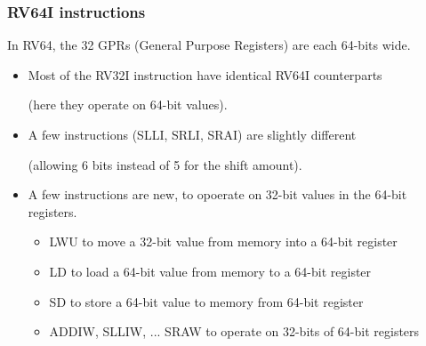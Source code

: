 \begin{frame}
\frametitle{RV64I instructions}

In RV64, the 32 GPRs (General Purpose Registers) are each 64-bits wide.

\vspace{1ex}

\begin{itemize}

\item Most of the RV32I instruction have identical RV64I counterparts

  {\footnotesize (here they operate on 64-bit values).}

\item A few instructions (SLLI, SRLI, SRAI) are slightly different

  {\footnotesize (allowing 6 bits instead of 5 for the shift amount).}

\item A few instructions are new, to opoerate on 32-bit values in the
  64-bit registers.
  {\footnotesize
    \begin{itemize}
    \item LWU to move a 32-bit value from memory into a 64-bit register
    \item LD to load a 64-bit value from memory to a 64-bit register
    \item SD to store a 64-bit value to memory from 64-bit register
    \item ADDIW, SLLIW, ... SRAW to operate on 32-bits of 64-bit registers
    \end{itemize}}

\end{itemize}

\end{frame}



